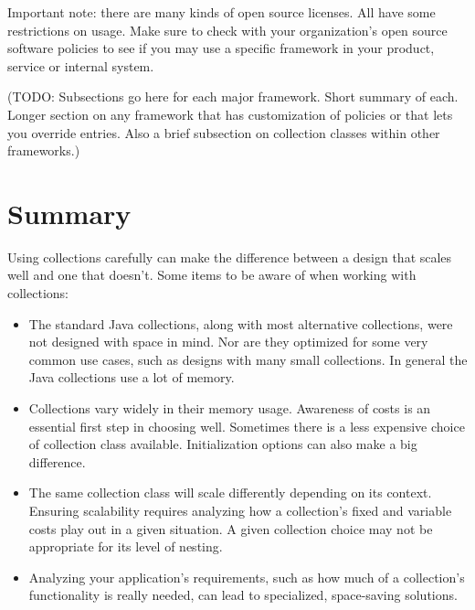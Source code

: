 Important note: there are many kinds of open source licenses. All have some
restrictions on usage. Make sure to check with your organization's open
source software policies to see if you may use a specific framework in 
your product, service or internal system.

(TODO: Subsections go here for each major framework. Short summary of each.
Longer section on any framework that has customization of policies or that lets you override
entries. Also a brief subsection on collection classes within other frameworks.)

\section{Summary}
Using collections carefully can
make the difference between a design that scales well and one that
doesn't. Some items to be aware of when working with collections:
\begin{itemize}
  \item The standard Java collections, along with most alternative
  collections, were not designed with space in mind. Nor are they optimized 
  for some very common use cases, such as designs with many small collections.
  In general the Java collections use a lot of memory.
  \item Collections vary widely in their memory usage. Awareness of
  costs is an essential first step in choosing well. Sometimes there is a less
  expensive choice of collection class available. Initialization options
  can also make a big difference.
  \item The same collection class will scale differently depending on its
  context. Ensuring scalability requires
  analyzing how a collection's fixed and variable costs
  play out in a given situation. A given collection choice may not be appropriate for its level of nesting.
  \item Analyzing your application's requirements, such as 
  how much of a collection's functionality is really needed, can lead to
  specialized, space-saving solutions.
\end{itemize}
